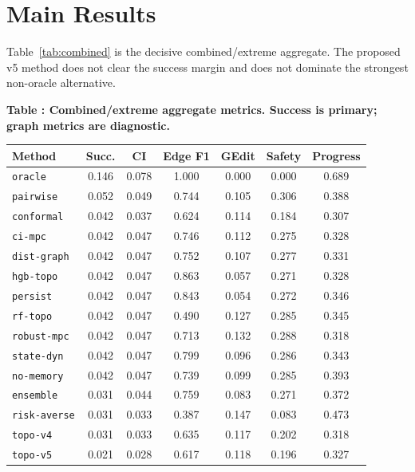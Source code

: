 \documentclass{article}
\begin{document}
\section{Main Results}
Table~\ref{tab:combined} is the decisive combined/extreme aggregate. The proposed v5 method does not clear the success margin and does not dominate the strongest non-oracle alternative.

\scriptsize
\begin{center}
\label{tab:combined}\textbf{Table \thetable: Combined/extreme aggregate metrics. Success is primary; graph metrics are diagnostic.}\\[0.4ex]
\begin{tabular}{lcccccc}
\toprule
Method & Succ. & CI & Edge F1 & GEdit & Safety & Progress \\
\midrule
\texttt{oracle} & 0.146 & 0.078 & 1.000 & 0.000 & 0.000 & 0.689 \\
\texttt{pairwise} & 0.052 & 0.049 & 0.744 & 0.105 & 0.306 & 0.388 \\
\texttt{conformal} & 0.042 & 0.037 & 0.624 & 0.114 & 0.184 & 0.307 \\
\texttt{ci-mpc} & 0.042 & 0.047 & 0.746 & 0.112 & 0.275 & 0.328 \\
\texttt{dist-graph} & 0.042 & 0.047 & 0.752 & 0.107 & 0.277 & 0.331 \\
\texttt{hgb-topo} & 0.042 & 0.047 & 0.863 & 0.057 & 0.271 & 0.328 \\
\texttt{persist} & 0.042 & 0.047 & 0.843 & 0.054 & 0.272 & 0.346 \\
\texttt{rf-topo} & 0.042 & 0.047 & 0.490 & 0.127 & 0.285 & 0.345 \\
\texttt{robust-mpc} & 0.042 & 0.047 & 0.713 & 0.132 & 0.288 & 0.318 \\
\texttt{state-dyn} & 0.042 & 0.047 & 0.799 & 0.096 & 0.286 & 0.343 \\
\texttt{no-memory} & 0.042 & 0.047 & 0.739 & 0.099 & 0.285 & 0.393 \\
\texttt{ensemble} & 0.031 & 0.044 & 0.759 & 0.083 & 0.271 & 0.372 \\
\texttt{risk-averse} & 0.031 & 0.033 & 0.387 & 0.147 & 0.083 & 0.473 \\
\texttt{topo-v4} & 0.031 & 0.033 & 0.635 & 0.117 & 0.202 & 0.318 \\
\texttt{topo-v5} & 0.021 & 0.028 & 0.617 & 0.118 & 0.196 & 0.327 \\
\bottomrule
\end{tabular}
\end{center}
\normalsize
\end{document}
